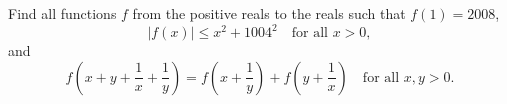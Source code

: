 Find all functions $f$ from the positive reals to the reals such that $f(1)=2008$,
\[|f(x)|\le x^2+1004^2\quad\text{for all }x>0,\]
and
\[f\left(x+y+\dfrac{1}{x}+\dfrac{1}{y}\right)=f\left(x+\dfrac{1}{y}\right)+f\left(y+\dfrac{1}{x}\right)\quad\text{for all }x,y>0 .\]
